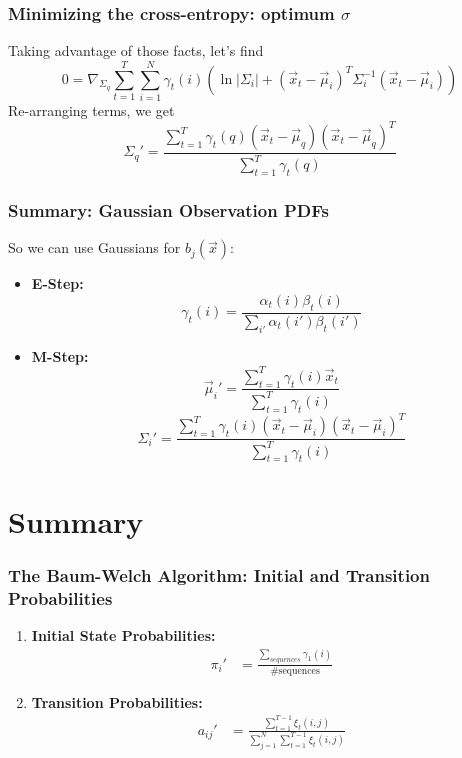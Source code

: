 \documentclass{beamer}
\begin{document}
  
\begin{frame}
  \frametitle{Minimizing the cross-entropy: optimum $\sigma$}

  Taking advantage of those facts, let's find
  \begin{displaymath}
    0 = \nabla_{\Sigma_q}\sum_{t=1}^T\sum_{i=1}^N\gamma_t(i)\left(\ln|\Sigma_i|+
    (\vec{x}_{t}-\vec\mu_{i})^T\Sigma_i^{-1}(\vec{x}_t-\vec\mu_i)\right)
  \end{displaymath}
  Re-arranging terms, we get
  \begin{displaymath}
    \Sigma_{q}' = \frac{\sum_{t=1}^T\gamma_t(q)(\vec{x}_{t}-\vec\mu_{q})(\vec{x}_t-\vec\mu_q)^T}{\sum_{t=1}^T\gamma_t(q)}
  \end{displaymath}
\end{frame}

\begin{frame}
  \frametitle{Summary: Gaussian Observation PDFs}

  So we can use Gaussians for $b_j(\vec{x})$:
  \begin{itemize}
  \item {\bf E-Step:}
    \[
    \gamma_t(i) = \frac{\alpha_t(i)\beta_t(i)}{\sum_{i'}\alpha_t(i')\beta_t(i')}
    \]
  \item {\bf M-Step:}
    \begin{displaymath}
      \vec\mu_{i}' = \frac{\sum_{t=1}^T\gamma_t(i)\vec{x}_{t}}{\sum_{t=1}^T\gamma_t(i)}
    \end{displaymath}
    \begin{displaymath}
      \Sigma_{i}' = \frac{\sum_{t=1}^T\gamma_t(i)(\vec{x}_{t}-\vec\mu_{i})(\vec{x}_t-\vec\mu_i)^T}{\sum_{t=1}^T\gamma_t(i)}
    \end{displaymath}
  \end{itemize}
\end{frame}


\section[Summary]{Summary}
\setcounter{subsection}{1}

\begin{frame}
  \frametitle{The Baum-Welch Algorithm: Initial and Transition Probabilities}

  \begin{enumerate}
  \item {\bf Initial State Probabilities:}
    \begin{align*}
      \pi_i' &=\frac{\sum_{sequences} \gamma_1(i)}{\mbox{\# sequences}}
    \end{align*}
  \item {\bf Transition Probabilities:}
    \begin{align*}
      a_{ij}' &=\frac{\sum_{t=1}^{T-1} \xi_t(i,j)}{\sum_{j=1}^N\sum_{t=1}^{T-1}\xi_t(i,j)}
    \end{align*}
  \end{enumerate}
\end{frame}
\end{document}
